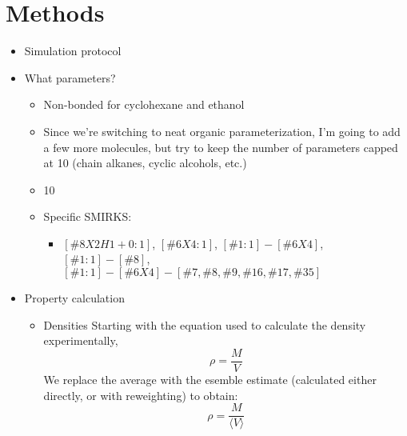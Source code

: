 \documentclass[aps,pre,nofootinbib,superscriptaddress,linenumbers,10pt, draft,tightenlines]{revtex4-1}
\begin{document}
\section{Methods}
\begin{itemize}
	\item Simulation protocol
	\item What parameters?
	\begin{itemize}
		\item Non-bonded for cyclohexane and ethanol 
		\item Since we're switching to neat organic parameterization, I'm going to add a few more molecules,
		      but try to keep the number of parameters capped at 10 (chain alkanes, cyclic alcohols, etc.)
		\item 10
		\item Specific SMIRKS:
		\begin{itemize}
			\item $[\#8X2H1+0:1]$, $[\#6X4:1]$, $[\#1:1]-[\#6X4]$, $[\#1:1]-[\#8]$, 
			      $[\#1:1]-[\#6X4]-[\#7,\#8,\#9,\#16,\#17,\#35]$
		\end{itemize}
	\end{itemize}
    \item Property calculation
    \begin{itemize}
    	\item Densities
    	Starting with the equation used to calculate the density experimentally, 
    	\begin{equation} \rho = \frac{M}{V} \end{equation}
    	We replace the average with the esemble estimate (calculated either directly, or with reweighting) to obtain: 
    	\begin{equation} \rho = \frac{M}{\langle V \rangle} \end{equation}

\end{itemize}
\end{itemize}
\end{document}
